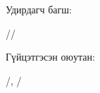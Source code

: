 \vspace{2mm}

\vspace{8mm}
\noindent\begin{minipage}{0.4\textwidth}
Удирдагч багш:
\end{minipage}
\hfill
\begin{minipage}{0.4\textwidth}
/\supervisor/
\end{minipage}

\vspace{5mm}
\noindent\begin{minipage}{0.4\textwidth}
Гүйцэтгэсэн оюутан:
\end{minipage}
\hfill
\begin{minipage}{0.4\textwidth}
/\authorcode, \authorshort/
\end{minipage}